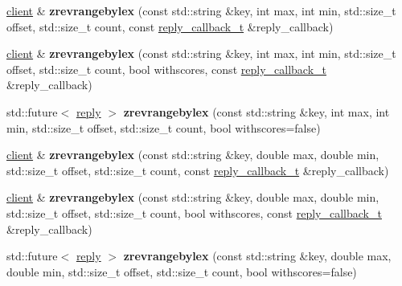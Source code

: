 \begin{DoxyCompactItemize}
\mbox{\hyperlink{classcpp__redis_1_1client}{client}} \& {\bfseries zrevrangebylex} (const std\+::string \&key, int max, int min, std\+::size\+\_\+t offset, std\+::size\+\_\+t count, const \mbox{\hyperlink{classcpp__redis_1_1client_af7a65eb21aa25230bfbb0b0203c4fc04}{reply\+\_\+callback\+\_\+t}} \&reply\+\_\+callback)
\item 
\mbox{\label{classcpp__redis_1_1client_a8bb859ca66c7bbe584181c2af6cbd024}} 
\mbox{\hyperlink{classcpp__redis_1_1client}{client}} \& {\bfseries zrevrangebylex} (const std\+::string \&key, int max, int min, std\+::size\+\_\+t offset, std\+::size\+\_\+t count, bool withscores, const \mbox{\hyperlink{classcpp__redis_1_1client_af7a65eb21aa25230bfbb0b0203c4fc04}{reply\+\_\+callback\+\_\+t}} \&reply\+\_\+callback)
\item 
\mbox{\label{classcpp__redis_1_1client_a05c02025eba044745de5da4d8ddfa778}} 
std\+::future$<$ \mbox{\hyperlink{classcpp__redis_1_1reply}{reply}} $>$ {\bfseries zrevrangebylex} (const std\+::string \&key, int max, int min, std\+::size\+\_\+t offset, std\+::size\+\_\+t count, bool withscores=false)
\item 
\mbox{\label{classcpp__redis_1_1client_a965894df56553bd06775a2d2779769e6}} 
\mbox{\hyperlink{classcpp__redis_1_1client}{client}} \& {\bfseries zrevrangebylex} (const std\+::string \&key, double max, double min, std\+::size\+\_\+t offset, std\+::size\+\_\+t count, const \mbox{\hyperlink{classcpp__redis_1_1client_af7a65eb21aa25230bfbb0b0203c4fc04}{reply\+\_\+callback\+\_\+t}} \&reply\+\_\+callback)
\item 
\mbox{\label{classcpp__redis_1_1client_a897aa613007343505697a2fe276b0925}} 
\mbox{\hyperlink{classcpp__redis_1_1client}{client}} \& {\bfseries zrevrangebylex} (const std\+::string \&key, double max, double min, std\+::size\+\_\+t offset, std\+::size\+\_\+t count, bool withscores, const \mbox{\hyperlink{classcpp__redis_1_1client_af7a65eb21aa25230bfbb0b0203c4fc04}{reply\+\_\+callback\+\_\+t}} \&reply\+\_\+callback)
\item 
\mbox{\label{classcpp__redis_1_1client_a1065a119482b3897adefb4a0607e6231}} 
std\+::future$<$ \mbox{\hyperlink{classcpp__redis_1_1reply}{reply}} $>$ {\bfseries zrevrangebylex} (const std\+::string \&key, double max, double min, std\+::size\+\_\+t offset, std\+::size\+\_\+t count, bool withscores=false)

\end{DoxyCompactItemize}
